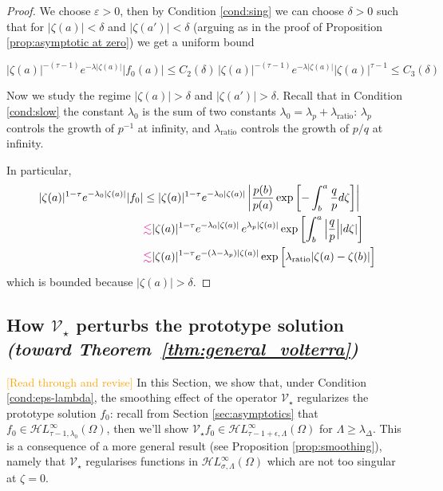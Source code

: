 \documentclass{article}
\theoremstyle{plain}
\newcommand{\singexp}[2]{\mathcal{H}L^\infty_{#1, #2}}
\newcommand{\softpart}{\mathcal{V}_\star}
\begin{document}
\begin{proof}
We choose $\varepsilon>0$, then by Condition \eqref{cond:sing} we can choose $\delta>0$ such that for $|\zeta(a)|<\delta$ and $|\zeta(a')|<\delta$ (arguing as in the proof of Proposition \ref{prop:asymptotic at zero}) we get a uniform bound 

\[   |\zeta(a)|^{-(\tau-1)} e^{-\lambda |\zeta(a)|} |f_0(a)|\leq  C_2(\delta)\, |\zeta(a)|^{-(\tau-1)} e^{-\lambda |\zeta(a)|} |\zeta(a)|^{\tau-1} \leq C_3(\delta)
\]

Now we study the regime $|\zeta(a)|>\delta$ and $|\zeta(a')|>\delta$. Recall that in Condition \eqref{cond:slow} the constant $\lambda_0$ is the sum of two constants $\lambda_0=\lambda_p+\lambda_\text{ratio}$: $\lambda_p$ controls the growth of $p^{-1}$ at infinity, and $\lambda_\text{ratio}$ controls the growth of $p/q$ at infinity. 

In particular, 
      \begin{align*}
          |\zeta(a)|^{1-\tau} e^{-\lambda_0 |\zeta(a)|} |f_0|&\leq  |\zeta(a)|^{1-\tau} e^{-\lambda_0 |\zeta(a)|} \left\vert\frac{p(b)}{p(a)}\exp\left[-\int_{b}^{a}\frac{q}{p} d\zeta\right]\right\vert \\
          & \textcolor{magenta}{\lesssim}  |\zeta(a)|^{1-\tau} e^{-\lambda_0 |\zeta(a)|}  \, e^{\lambda_p|\zeta(a)|}\exp\left[\int_{b}^{a} \Big\vert\frac{q}{p} \Big\vert |d\zeta| \right]\\
          & \textcolor{magenta}{\lesssim}  |\zeta(a)|^{1-\tau} e^{-(\lambda-\lambda_p) |\zeta(a)|} \exp\Big[\lambda_\text{ratio} |\zeta(a)-\zeta(b)| \Big]
      \end{align*}
   which is bounded because $|\zeta(a)|>\delta$. 


\end{proof}

\subsection{How $\softpart$ perturbs the prototype solution \\ \textit{(toward Theorem~\ref{thm:general_volterra})}}\label{sec:image under soft_part}

\textcolor{orange}{[Read through and revise]} In this Section, we show that, under Condition \eqref{cond:eps-lambda}, the smoothing effect of the operator $\softpart$ regularizes the prototype solution $f_0$: recall from Section \ref{sec:asymptotics} that $f_0\in\singexp{\tau-1}{\lambda_0}(\Omega)$, then we'll show $\softpart f_0 \in\singexp{\tau-1+\epsilon}{\Lambda}(\Omega)$ for $\Lambda\geq \lambda_\Delta$. This is a consequence of a more general result (see Proposition \ref{prop:smoothing}), namely that $\softpart$ regularises functions in $\singexp{\sigma}{\Lambda}(\Omega)$ which are not too singular at $\zeta=0$.  
\end{document}
